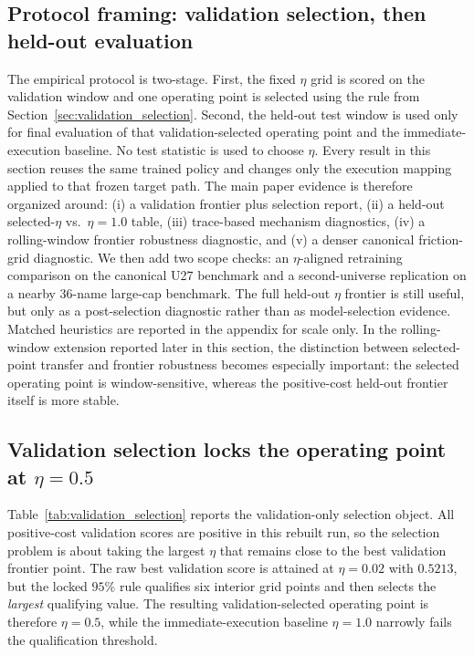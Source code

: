 \documentclass[10pt,twocolumn]{article}
\begin{document}
\subsection{Protocol framing: validation selection, then held-out evaluation}
The empirical protocol is two-stage. First, the fixed $\eta$ grid is scored on the validation window and one operating point is selected using the rule from Section~\ref{sec:validation_selection}. Second, the held-out test window is used only for final evaluation of that validation-selected operating point and the immediate-execution baseline. No test statistic is used to choose $\eta$. Every result in this section reuses the same trained policy and changes only the execution mapping applied to that frozen target path. The main paper evidence is therefore organized around: (i) a validation frontier plus selection report, (ii) a held-out selected-$\eta$ vs.\ $\eta=1.0$ table, (iii) trace-based mechanism diagnostics, (iv) a rolling-window frontier robustness diagnostic, and (v) a denser canonical friction-grid diagnostic. We then add two scope checks: an $\eta$-aligned retraining comparison on the canonical U27 benchmark and a second-universe replication on a nearby 36-name large-cap benchmark. The full held-out $\eta$ frontier is still useful, but only as a post-selection diagnostic rather than as model-selection evidence. Matched heuristics are reported in the appendix for scale only. In the rolling-window extension reported later in this section, the distinction between selected-point transfer and frontier robustness becomes especially important: the selected operating point is window-sensitive, whereas the positive-cost held-out frontier itself is more stable.

\subsection{Validation selection locks the operating point at \texorpdfstring{$\eta=0.5$}{eta=0.5}}
Table~\ref{tab:validation_selection} reports the validation-only selection object. All positive-cost validation scores are positive in this rebuilt run, so the selection problem is about taking the largest $\eta$ that remains close to the best validation frontier point. The raw best validation score is attained at $\eta=0.02$ with $0.5213$, but the locked $95\%$ rule qualifies six interior grid points and then selects the \emph{largest} qualifying value. The resulting validation-selected operating point is therefore $\eta=0.5$, while the immediate-execution baseline $\eta=1.0$ narrowly fails the qualification threshold.
\end{document}
